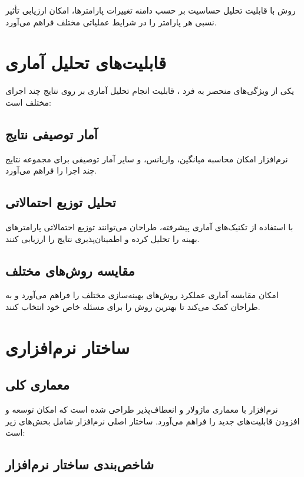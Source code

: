 روش  با قابلیت تحلیل حساسیت بر حسب دامنه تغییرات پارامترها، امکان ارزیابی تأثیر نسبی هر پارامتر را در شرایط عملیاتی مختلف فراهم می‌آورد.

\section{قابلیت‌های تحلیل آماری}

یکی از ویژگی‌های منحصر به فرد ، قابلیت انجام تحلیل آماری بر روی نتایج چند اجرای مختلف است:

\subsection{آمار توصیفی نتایج}

نرم‌افزار امکان محاسبه میانگین، واریانس، و سایر آمار توصیفی برای مجموعه نتایج چند اجرا را فراهم می‌آورد.

\subsection{تحلیل توزیع احتمالاتی}

با استفاده از تکنیک‌های آماری پیشرفته، طراحان می‌توانند توزیع احتمالاتی پارامترهای بهینه را تحلیل کرده و اطمینان‌پذیری نتایج را ارزیابی کنند.

\subsection{مقایسه روش‌های مختلف}

 امکان مقایسه آماری عملکرد روش‌های بهینه‌سازی مختلف را فراهم می‌آورد و به طراحان کمک می‌کند تا بهترین روش را برای مسئله خاص خود انتخاب کنند.

\section{ساختار نرم‌افزاری }

\subsection{معماری کلی}

نرم‌افزار  با معماری ماژولار و انعطاف‌پذیر طراحی شده است که امکان توسعه و افزودن قابلیت‌های جدید را فراهم می‌آورد. ساختار اصلی نرم‌افزار شامل بخش‌های زیر است:

\subsection{شاخص‌بندی ساختار نرم‌افزار}

